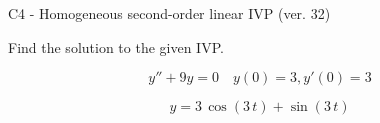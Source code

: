 \begin{exercise}
  \begin{exerciseTitle}C4 - Homogeneous second-order linear IVP (ver. 32)\end{exerciseTitle}
  \begin{exerciseStatement}
    
Find the solution to the given IVP.

    
\[y''+9y = 0 \hspace{1em} y(0) = 3 , y'(0) = 3\]

  \end{exerciseStatement}
  \begin{exerciseAnswer}
    
\[y= 3 \, \cos\left(3 \, t\right) + \sin\left(3 \, t\right)\]

  \end{exerciseAnswer}
\end{exercise}